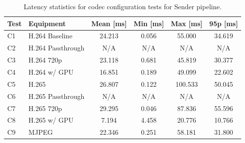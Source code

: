 \begin{table}[H]
    \centering
    \caption{Latency statistics for codec configuration tests for Sender pipeline.}\label{tab:send_codec_latency}
    \begin{tabular}{|l|l|c|c|c|c|}
    \hline
    \textbf{Test} & \textbf{Equipment} & \textbf{Mean [ms]} & \textbf{Min [ms]} & \textbf{Max [ms]} & \textbf{95p [ms]} \\
    \hline
    C1 & H.264 Baseline & 24.213 & 0.056 & 55.000 & 34.619\\
    \hline
    C2 & H.264 Passthrough & N/A & N/A & N/A & N/A  \\
    \hline
    C3 & H.264 720p & 23.118 & 0.681 & 45.819 & 30.377 \\
    \hline
    C4 & H.264 w/ GPU & 16.851 & 0.189 & 49.099 & 22.602  \\
    \hline
    C5 & H.265 & 26.807 & 0.122 & 100.533 & 50.045\\
    \hline
    C6 & H.265 Passthrough & N/A & N/A & N/A & N/A \\
    \hline
    C7 & H.265 720p & 29.295 & 0.046 & 87.836 & 55.596 \\
    \hline
    C8 & H.265 w/ GPU & 7.194 & 4.458 & 20.776 & 10.766 \\
    \hline
    C9 & MJPEG & 22.346 & 0.251 & 58.181 & 31.800  \\
    \hline
    \end{tabular}
\end{table}
